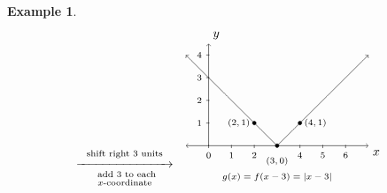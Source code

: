 \documentclass[12pt]{book}
\theoremstyle{definition}
\newtheorem{example}{Example}
\begin{document}
\begin{example}
\[\begin{array}{ccc}
\stackrel{\stackrel{\mbox{\scriptsize shift right $3$ units}}{\xrightarrow{\hspace{1in}}}}{\stackrel{\mbox{ \scriptsize add $3$ to each}}{\mbox{\scriptsize $x$-coordinate}}} 

&

\begin{tikzpicture}[xscale=0.65,yscale=0.65]
	\draw [<->](-1,0) -- coordinate (x axis mid) (7,0) node[below right] {$x$};
	\draw [->](0,0) -- coordinate (x axis mid) (0,4.5) node[above right] {$y$};
	\draw [->] plot [domain=3:7, samples=100] (\x,{\x-3});
	\draw [->] plot [domain=3:-1, samples=100] (\x,{-\x+3});
	\draw[fill] (2,1) circle (0.08);
	\draw[fill] (4,1) circle (0.08);
	\draw[fill] (3,0) circle (0.08);
	\foreach \x in {0,1,2,4,5,6}
	\draw (\x,1pt) -- (\x,-3pt)
	node[anchor=north] {\scriptsize $\x$};
	\foreach \y in {1,...,4}
	\draw (1pt,\y) -- (-3pt,\y) 
	node[anchor=east] {\scriptsize $\y$};
	\draw (4,1) node[right] {\scriptsize $(4,1)$}; 
	\draw (2,1) node[left] {\scriptsize $(2,1)$}; 
	\draw (3,-0.3) node[below] {\scriptsize $(3,0)$}; 
	\draw (3,-1) node[below] {\scriptsize $g(x)=f(x-3)=|x-3|$};  
\end{tikzpicture}
\end{array}\]
\end{example}
\end{document}
